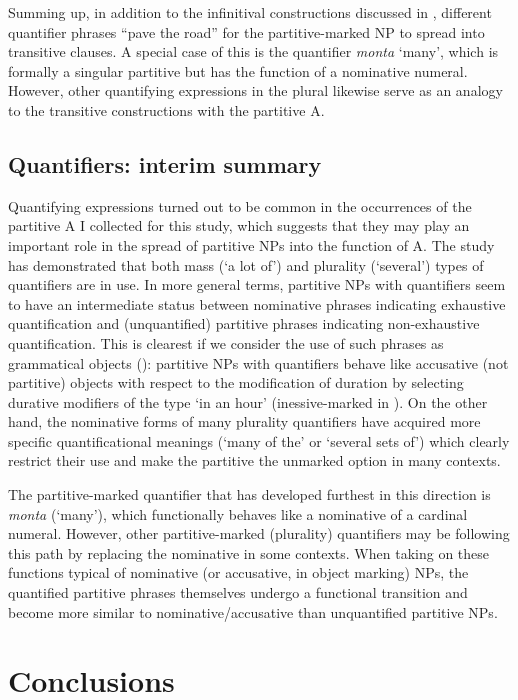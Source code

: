 \documentclass[output=paper]{LSP/langsci}
\begin{document}
Summing up, in addition to the infinitival constructions discussed in , different quantifier phrases “pave the road” for the partitive-marked NP to spread into transitive clauses. A special case of this is the quantifier \textit{monta} ‘many’, which is formally a singular partitive but has the function of a nominative numeral. However, other quantifying expressions in the plural likewise serve as an analogy to the transitive constructions with the partitive A.

\subsection{Quantifiers: interim summary}
\label{15-hu-sec:6-3}

Quantifying expressions turned out to be common in the occurrences of the partitive A I collected for this study, which suggests that they may play an important role in the spread of partitive NPs into the function of A. The study has demonstrated that both mass (‘a lot of’) and plurality (‘several’) types of quantifiers are in use. In more general terms,  partitive NPs with quantifiers seem to have an intermediate status between nominative phrases indicating exhaustive quantification and (unquantified) partitive phrases indicating non-exhaustive quantification. 
This is clearest if we consider the use of such phrases as grammatical objects (\cf {}): partitive NPs with quantifiers behave like accusative (not partitive) objects with respect to the modification of duration by selecting durative modifiers of the type ‘in an hour’ (inessive-marked in ). 
On the other hand, the nominative forms of many plurality quantifiers have acquired more specific quantificational meanings (\eg ‘many of the’ or ‘several sets of’) which clearly restrict their use and make the partitive the unmarked option in many contexts. 

The partitive-marked quantifier that has developed furthest in this direction is \textit{monta} (‘many’), which functionally behaves like a nominative of a cardinal numeral. However, other partitive-marked (plurality) quantifiers may be following this path by replacing the nominative in some contexts. When taking on these functions typical of nominative (or accusative, in object marking) NPs, the quantified partitive phrases themselves undergo a functional transition and become more similar to nominative/accusative than unquantified partitive NPs. 

\section{Conclusions}
\label{15-hu-sec:7}
\end{document}

